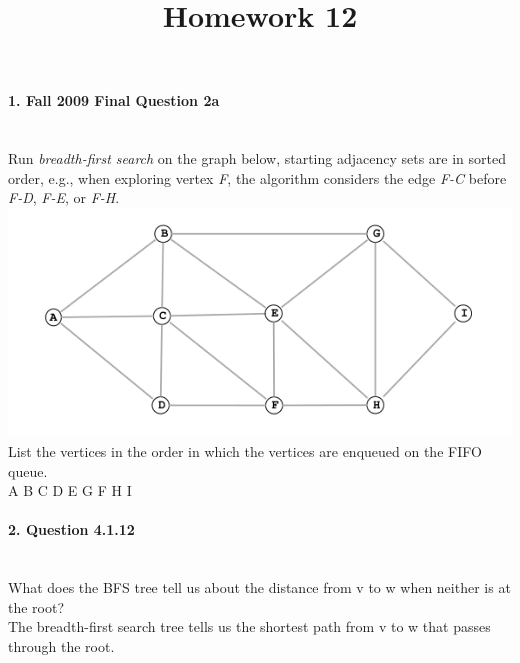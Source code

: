 \documentclass{article}
\begin{document}
\title{Homework 12}
\date{}
\maketitle


\paragraph{\Large 1. Fall 2009 Final Question 2a}\mbox{}\\
Run \textit{breadth-first search} on the graph below, starting adjacency sets are in sorted order, e.g., when exploring vertex \textit{F}, the algorithm considers the edge \textit{F-C} before \textit{F-D}, \textit{F-E}, or \textit{F-H}.\\

\includegraphics[width=\linewidth]{fin-f09-2a}\\

\noindent List the vertices in the order in which the vertices are enqueued on the FIFO queue.\\

A B C D E G F H I

\paragraph{\Large 2. Question 4.1.12}\mbox{}\\
What does the BFS tree tell us about the distance from v to w when neither is at the root?\\

The breadth-first search tree tells us the shortest path from v to w that passes through the root.
\end{document}
